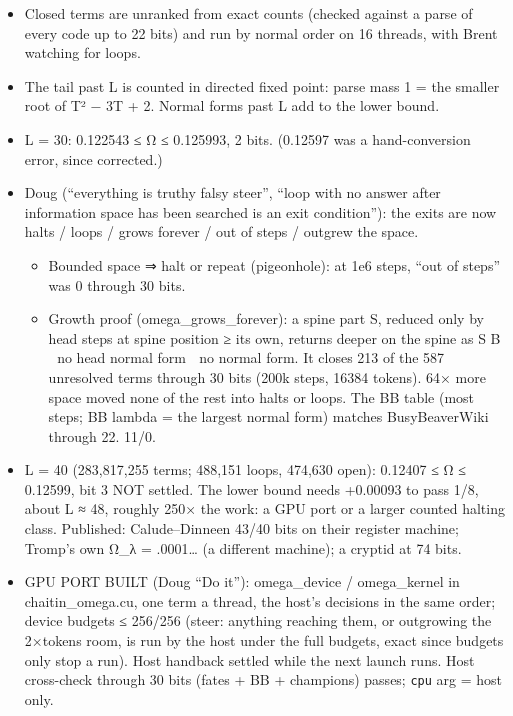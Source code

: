 \begin{enumerate}
\begin{itemize}
\begin{itemize}
\begin{itemize}
\item Closed terms are unranked from exact counts (checked against a parse of every code up to 22 bits) and run by normal order on 16 threads, with Brent watching for loops.
\item The tail past L is counted in directed fixed point: parse mass 1 = the smaller root of T² − 3T + 2. Normal forms past L add to the lower bound.
\item L = 30: 0.122543 ≤ Ω ≤ 0.125993, 2 bits. (0.12597 was a hand-conversion error, since corrected.)
\item Doug (“everything is truthy falsy steer”, “loop with no answer after information space has been searched is an exit condition”): the exits are now halts / loops / grows forever / out of steps / outgrew the space.

\begin{itemize}
\item Bounded space ⇒ halt or repeat (pigeonhole): at 1e6 steps, “out of steps” was 0 through 30 bits.
\item Growth proof (omega\_\allowbreak{}grows\_\allowbreak{}forever): a spine part S, reduced only by head steps at spine position ≥ its own, returns deeper on the spine as S B⃗ ⇒ no head normal form ⇒ no normal form. It closes 213 of the 587 unresolved terms through 30 bits (200k steps, 16384 tokens). 64× more space moved none of the rest into halts or loops. The BB table (most steps; BB lambda = the largest normal form) matches BusyBeaverWiki through 22. 11/0.
\end{itemize}
\item L = 40 (283,817,255 terms; 488,151 loops, 474,630 open): 0.12407 ≤ Ω ≤ 0.12599, bit 3 NOT settled. The lower bound needs +0.00093 to pass 1/8, about L ≈ 48, roughly 250× the work: a GPU port or a larger counted halting class. Published: Calude–Dinneen 43/40 bits on their register machine; Tromp's own Ω\_\allowbreak{}λ = .0001… (a different machine); a cryptid at 74 bits.
\item GPU PORT BUILT (Doug “Do it”): omega\_\allowbreak{}device / omega\_\allowbreak{}kernel in chaitin\_\allowbreak{}omega.cu, one term a thread, the host's decisions in the same order; device budgets ≤ 256/256 (steer: anything reaching them, or outgrowing the 2×tokens room, is run by the host under the full budgets, exact since budgets only stop a run). Host handback settled while the next launch runs. Host cross-check through 30 bits (fates + BB + champions) passes; \texttt{cpu} arg = host only.


\end{itemize}
\end{itemize}
\end{itemize}
\end{enumerate}
